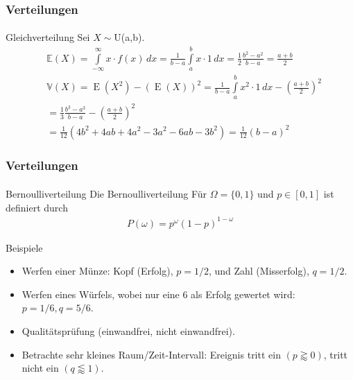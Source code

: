 \documentclass{beamer}
\begin{document}
\begin{frame}
    \frametitle{Verteilungen}
\framesubtitle{}

\begin{block}{Gleichverteilung}
Sei $X \sim $U(a,b).
\begin{align*}
& \mathbb{E}(X) =\int\limits_{-\infty}^\infty x \cdot f(x)\,dx = \frac 1{b-a}\int\limits_a^b x\cdot 1\,dx = \frac 12\frac{b^2-a^2}{b-a} = \frac{a+b}2 \\
& \mathbb{V}(X) = \operatorname{E}(X^2) - \left({\operatorname{E}(X)} \right)^2  = \frac{1}{b - a}\int\limits_a^b {x^2 \cdot 1\,dx}  - \left( {\frac{a + b}{2}} \right)^2  \\
 & = \frac{1}{3}\frac{b^3  - a^3}{b - a} - \left( {\frac{a + b}{2}} \right)^2 \\
    &= \frac{1}{12}\left( {4b^2  + 4ab + 4a^2  - 3a^2  - 6ab - 3b^2 } \right) = \frac{1}{12}(b - a)^2
\end{align*}
\end{block}
 \end{frame}






\begin{frame}
    \frametitle{Verteilungen}
\framesubtitle{}

\begin{block}{Bernoulliverteilung}
Die Bernoulliverteilung  Für $\Omega = \{ 0, 1\}$ und $p \in [0,1]$ ist definiert durch
\begin{align*}
P (\omega) = p^{\omega} (1-p)^{1 -\omega}
\end{align*}
\end{block}

\begin{block}{Beispiele}

\begin{itemize}
\item Werfen einer Münze: Kopf (Erfolg), $p=1/2$, und Zahl (Misserfolg), $q=1/2$.
\item Werfen eines Würfels, wobei nur eine 6 als Erfolg gewertet wird: $p=1/6, q=5/6$.
\item Qualitätsprüfung (einwandfrei, nicht einwandfrei).
\item Betrachte sehr kleines Raum/Zeit-Intervall: Ereignis tritt ein $(p \gtrapprox 0)$, tritt nicht ein $(q\lessapprox 1)$.
\end{itemize}

\end{block}
 \end{frame}
\end{document}
